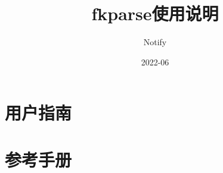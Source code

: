 \documentclass[a4paper,oneside,12pt]{book}
\begin{document}
\author{Notify}
\title{fkparse使用说明}
\date{2022-06}

\frontmatter
\maketitle
\tableofcontents

\mainmatter

\part{用户指南}









\part{参考手册}










\backmatter
\end{document}
